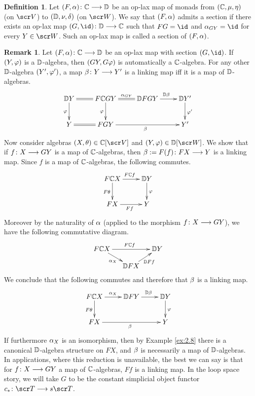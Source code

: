 \documentclass{amsart}
\theoremstyle{definition}
\newtheorem{defn}[thm]{Definition}
\newtheorem{rem}[thm]{Remark}
\begin{document}
\begin{defn}
    Let $(F,\alpha) \colon \mathbb{C} \longrightarrow \mathbb{D}$ be an op-lax map of monads from $(\mathbb{C},\mu,\eta)$ (on $\sV$) to $(\mathbb{D},\nu,\delta)$ (on $\sW$). We say that $(F,\alpha)$ admits a section 
    if there exists an op-lax map $(G,\id) \colon \bD \rtarr \bC$ such that $FG = \id$ and $\al_{GY} = \id$ for every $Y \in \sW$. Such an op-lax map is called a section of $(F,\alpha)$.
\end{defn}
\begin{rem}\label{ex:3.10}
    Let $(F,\alpha) \colon \mathbb{C} \longrightarrow \mathbb{D}$ be an op-lax map with section $(G,\id)$. If $(Y,\varphi)$ is a $\mathbb{D}$-algebra, then $(GY,G \varphi)$ is automatically a $\mathbb{C}$-algebra. For any other $\mathbb{D}$-algebra $(Y',\varphi')$, a map $\beta \colon Y \longrightarrow Y'$ is a linking map iff it is a map of $\mathbb{D}$-algebras.
    \[
    \xymatrix{
        \bD Y \ar@{=}[r] \ar[d]_{\phz} & F \bC GY \ar[d]_{\phz} \ar@{=}[r]^{\al_{GY}} & \bD FGY \ar[r]^{\bD \be} & \bD Y' \ar[d]^{\phz'} \\
        Y \ar@{=}[r] & FGY \ar[rr]_{\be} && Y'
    }
    \]
    Now consider algebras $(X,\tha) \in \bC[\sV]$ and $(Y,\phz) \in \bD[\sW]$. We show that if $f \colon X \longrightarrow GY$ is a map of $\mathbb{C}$-algebras, then $\beta := F(f) \colon FX \longrightarrow Y$ is a linking map. Since $f$ is a map of $\mathbb{C}$-algebras, the following commutes.
    \[
    \xymatrix{
        F \bC X \ar[r]^{F \bC f} \ar[d]_{F\tha} & \bD Y \ar[d]^{\phz}\\
        FX \ar[r]_{Ff} & Y
    }
    \]
    Moreover by the naturality of $\alpha$ (applied to the morphism $f \colon X \longrightarrow GY$), we have the following commutative diagram.
    \[
    \xymatrix@-1pc{
        F \bC X \ar[rr]^{F \bC f} \ar[dr]_{\al_X} & & \bD Y\\
        & \bD F X \ar[ur]_{\bD F f} &
    }
    \]
    \noindent We conclude that the following commutes and therefore that $\beta$ is a linking map.
    \[
    \xymatrix{
        F \bC X \ar[r]^{\al_X} \ar[d]_{F\tha} & \bD F Y \ar[r]^{\bD \be} & \bD Y \ar[d]^{\phz}\\
        FX \ar[rr]_{\be} & & Y
    }
    \]
    \noindent If furthermore $\alpha_X$ is an isomorphism, then by Example \ref{ex:2.8} there is a canonical $\mathbb{D}$-algebra structure on $FX$, and $\beta$ is necessarily a map of $\mathbb{D}$-algebras.
    In applications, where this reduction is unavailable, the best we can say is that for $f \colon X \longrightarrow GY$ a map of $\mathbb{C}$-algebras, $Ff$ is a linking map. In the loop space story, we will take $G$ to be the constant simplicial object functor $c_* \colon \sT \rtarr s\sT$. 


\end{rem}
\end{document}
